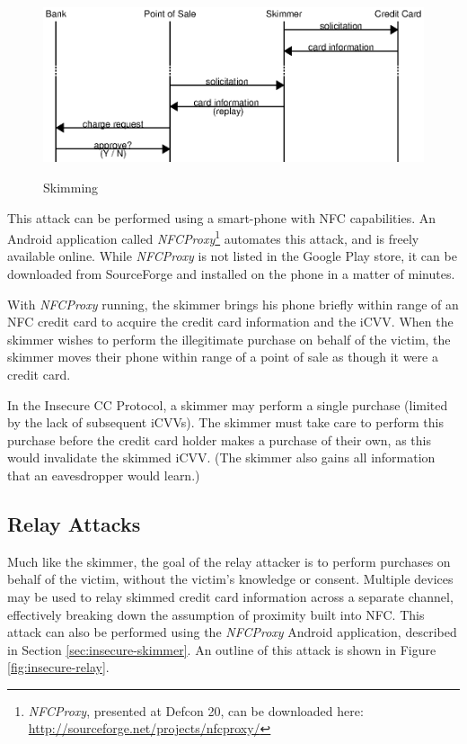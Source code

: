 \begin{figure}
  \caption{Skimming}
  \centering
    \includegraphics{img/attack-3-skim.eps}
  \label{fig:insecure-skimmer}
\end{figure}

This attack can be performed using a smart-phone with NFC capabilities.
An Android application called \emph{NFCProxy}\footnote{\emph{NFCProxy}\cite{NFCProxy}, presented at Defcon 20, can be downloaded here: \url{http://sourceforge.net/projects/nfcproxy/}} automates this attack, and is freely available online.
While \emph{NFCProxy} is not listed in the Google Play store, it can be downloaded from SourceForge and installed on the phone in a matter of minutes.

With \emph{NFCProxy} running, the skimmer brings his phone briefly within range of an NFC credit card to acquire the credit card information and  the iCVV.
When the skimmer wishes to perform the illegitimate purchase on behalf of the victim, the skimmer moves their phone within range of a point of sale as though it were a credit card.

In the Insecure CC Protocol, a skimmer may perform a single purchase (limited by the lack of subsequent iCVVs).
The skimmer must take care to perform this purchase before the credit card holder makes a purchase of their own, as this would invalidate the skimmed iCVV.
(The skimmer also gains all information that an eavesdropper would learn.)






\subsection{Relay Attacks}
\label{sec:insecure-relay}

Much like the skimmer, the goal of the relay attacker is to perform purchases on behalf of the victim, without the victim's knowledge or consent.
Multiple devices may be used to relay skimmed credit card information across a separate channel, effectively breaking down the assumption of proximity built into NFC.
This attack can also be performed using the \emph{NFCProxy} Android application, described in Section \ref{sec:insecure-skimmer}.
An outline of this attack is shown in Figure \ref{fig:insecure-relay}.

